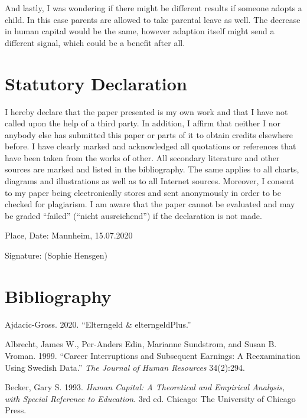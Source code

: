 \documentclass[
  12pt,
]{article}
\begin{document}
And lastly, I was wondering if there might be different results if someone adopts a child. In this case parents are allowed to take parental leave as well. The decrease in human capital would be the same, however adaption itself might send a different signal, which could be a benefit after all.
\newpage

\hypertarget{statutory-declaration}{%
\section*{Statutory Declaration}\label{statutory-declaration}}

I hereby declare that the paper presented is my own work and that I have not called upon the help of a third party. In addition, I affirm that neither I nor anybody else has submitted this paper or parts of it to obtain credits elsewhere before. I have clearly marked and acknowledged all quotations or references that have been taken from the works of other. All secondary literature and other sources are marked and listed in the bibliography. The same applies to all charts, diagrams and illustrations as well as to all Internet sources. Moreover, I consent to my paper being electronically stores and sent anonymously in order to be checked for plagiarism. I am aware that the paper cannot be evaluated and may be graded ``failed'' (``nicht ausreichend'') if the declaration is not made.

Place, Date: Mannheim, 15.07.2020

Signature:
(Sophie Hensgen)

\newpage

\hypertarget{bibliography}{%
\section*{Bibliography}\label{bibliography}}

\hypertarget{refs}{}
\leavevmode\hypertarget{ref-ajdacic-gross_elterngeld_2020}{}%
Ajdacic-Gross. 2020. ``Elterngeld \& elterngeldPlus.''

\leavevmode\hypertarget{ref-albrecht_career_1999}{}%
Albrecht, James W., Per-Anders Edin, Marianne Sundstrom, and Susan B. Vroman. 1999. ``Career Interruptions and Subsequent Earnings: A Reexamination Using Swedish Data.'' \emph{The Journal of Human Resources} 34(2):294.

\leavevmode\hypertarget{ref-becker_human_1993}{}%
Becker, Gary S. 1993. \emph{Human Capital: A Theoretical and Empirical Analysis, with Special Reference to Education}. 3rd ed. Chicago: The University of Chicago Press.
\end{document}
